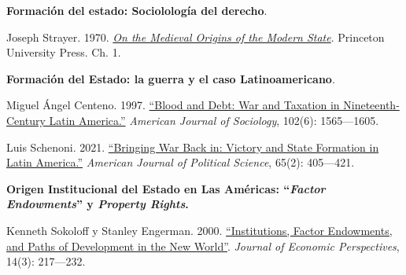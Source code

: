 \documentclass[letterpaper]{article}
\renewenvironment{itemize}{
  \begin{list}{}{
    \setlength{\leftmargin}{1.5em}
  }
}{
  \end{list}
}
\begin{document}
\begin{enumerate}[label=\roman*.]
\begin{itemize}
			\item[3.] {\bf Formaci\'on del estado: Sociololog\'ia del derecho}.
				\begin{itemize} 
					\item[$\circ$] Joseph Strayer. 1970. \href{https://github.com/hbahamonde/Ciencia_Politica_II/raw/master/Readings/Strayer.pdf}{\emph{On the Medieval Origins of the Modern State}}. Princeton University Press. Ch. 1.
				\end{itemize}

			\item[4.] {\bf Formaci\'on del Estado: la guerra y el caso Latinoamericano}.
				\begin{itemize}
					\item[$\circ$] Miguel \'Angel Centeno. 1997. \href{https://github.com/hbahamonde/Ciencia_Politica_II/raw/master/Readings/Centeno.pdf}{``Blood and Debt: War and Taxation in Nineteenth-Century Latin America.''} \emph{American Journal of Sociology}, 102(6): 1565---1605. 

					\item[$\circ$] Luis Schenoni. 2021. \href{https://github.com/hbahamonde/Ciencia_Politica_II/raw/master/Readings/Schenoni.pdf}{``Bringing War Back in: Victory and State Formation in Latin America.''} \emph{American Journal of Political Science}, 65(2): 405---421. 
					
				\end{itemize}

		\item[5.] {\bf Origen Institucional del Estado en Las Am\'ericas: ``\emph{Factor Endowments}'' y \emph{Property Rights}.}
				\begin{itemize}
					\item[$\circ$] Kenneth Sokoloff y Stanley Engerman. 2000. \href{https://github.com/hbahamonde/Ciencia_Politica_II/raw/master/Readings/Sokoloff_Engerman.pdf}{``Institutions, Factor Endowments, and Paths of Development in the New World''}. \emph{Journal of Economic Perspectives}, 14(3): 217---232. 
					

\end{itemize}
\end{itemize}
\end{enumerate}
\end{document}
